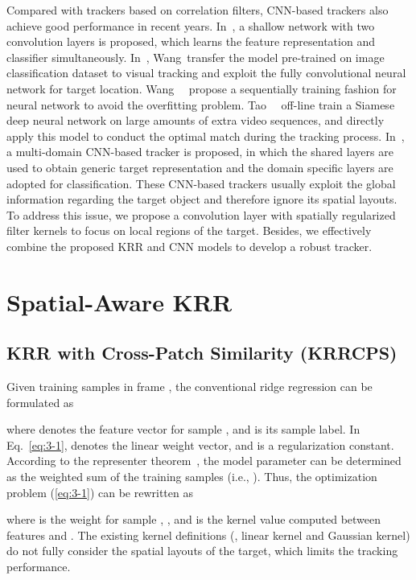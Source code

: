 \documentclass[10pt,twocolumn,letterpaper]{article}
\begin{document}
Compared with trackers based on correlation filters, CNN-based trackers also
achieve good performance in recent years. In~\cite{li2014robust}, a shallow network
with two convolution layers is proposed, which learns the feature representation
and classifier simultaneously. In~\cite{wang2015visual}, Wang~\etal transfer the
model pre-trained on image classification dataset to visual tracking and exploit
the fully convolutional neural network for target location.
Wang~\etal~\cite{wang2016stct} propose a sequentially training fashion for neural
network to avoid the overfitting problem. Tao~\etal~\cite{tao2016siamese} off-line
train a Siamese deep neural network on large amounts of extra video sequences, and
directly apply this model to conduct the optimal match during the tracking process.
In~\cite{nam2016learning}, a multi-domain CNN-based tracker is proposed,
in which the shared layers are used to obtain generic target representation
and the domain specific layers are adopted for classification.
These CNN-based trackers usually exploit the global information regarding the target
object and therefore ignore its spatial layouts. To address this issue, we propose
a convolution layer with spatially regularized filter kernels to focus on local
regions of the target. Besides, we effectively combine the proposed KRR and CNN models
to develop a robust tracker.

\section{Spatial-Aware KRR}
\subsection{KRR with Cross-Patch Similarity (KRRCPS)}
Given  training samples  in frame ,
the conventional ridge regression can be formulated as

where  denotes the feature vector for sample ,
and  is its sample label.
In Eq.~\ref{eq:3-1},  denotes the
linear weight vector, and  is a regularization constant.
According to the representer theorem~\cite{representertheorem}, the model parameter
 can be determined as the weighted sum of the training samples (i.e.,
).
Thus, the optimization problem (\ref{eq:3-1}) can be rewritten as

where  is the weight for sample , ,
and  is the kernel value computed between features  and .
The existing kernel definitions (\eg, linear kernel and Gaussian kernel) do not fully
consider the spatial layouts of the target, which limits the tracking performance.
\end{document}
